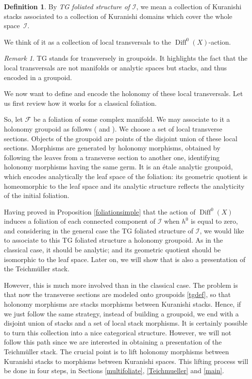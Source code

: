 \documentclass[JEP,XML,SOM,Unicode]{cedram}
\let\mathcal\mathscr
\DeclareMathOperator{\Diff}{Diff}
\theoremstyle{plain}
\theoremstyle{definition}
\newtheorem{definition}[theorem]{Definition}
\theoremstyle{remark}
\newtheorem{remark}[theorem]{Remark}
\numberwithin{equation}{section}
\newcommand{\D}{\Diff^0(X)}
\newcommand{\cI}{\mathcal{I}}
\begin{document}
\begin{definition}
\label{tgfoldef}
By \emph{TG foliated structure of $\cI$}, we mean a collection of Kuranishi stacks associated to a collection of Kuranishi domains which cover the whole space~$\cI$.
\end{definition}
We think of it as a collection of local transversals to the $\D$-action.

\begin{remark}
\label{rkTG}
TG stands for transversely in groupoids. It highlights the fact that the local transversals are not manifolds or analytic spaces but stacks, and thus encoded in a groupoid.
\end{remark}

We now want to define and encode the holonomy of these local transversals. Let us first review how it works for a classical foliation.

So, let $\mathcal F$ be a foliation of some complex manifold. We may associate to it a holonomy groupoid as follows (\cite[\S 5.2]{Moerdijk} and \cite{Ha}). We choose a set of local transverse sections. Objects of the groupoid are points of the disjoint union of these local sections. Morphisms are generated by holonomy morphisms, obtained by following the leaves from a transverse section to another one, identifying holonomy morphisms having the same germ. It is an étale analytic groupoid, which encodes analytically the leaf space of the foliation: its geometric quotient is homeomorphic to the leaf space and its analytic structure reflects the analyticity of the initial foliation.

Having proved in Proposition \ref{foliationsimple} that the action of $\Diff^0(X)$ induces a foliation of each connected component of $\cI$ when $h^0$ is equal to zero, and considering in the general case the TG foliated structure of $\cI$, we would like to associate to this TG foliated structure a holonomy groupoid. As in the classical case, it should be analytic; and its geometric quotient should be isomorphic to the leaf space. Later on, we will show that is also a presentation of the Teichmüller stack.

However, this is much more involved than in the classical case. The problem is that now the transverse sections are modeled onto groupoids \eqref{tgdef}, so that holonomy morphisms are stacks morphisms between Kuranishi stacks. Hence, if we just follow the same strategy, instead of building a groupoid, we end with a disjoint union of stacks and a set of local stack morphisms. It is certainly possible to turn this collection into a nice categorical structure. However, we will not follow this path since we are interested in obtaining a presentation of the Teichmüller stack. The crucial point is to lift holonomy morphisms between Kuranishi stacks to morphisms between Kuranishi spaces. This lifting process will be done in four steps, in Sections \ref{multifoliate}, \ref{Teichmueller} and \ref{main}.
\end{document}
